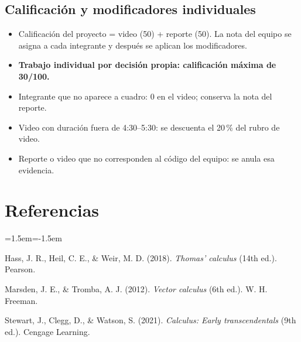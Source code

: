 \documentclass[11pt,letterpaper]{article}
\newcommand{\dest}[1]{\textcolor{accentcolor}{\textbf{#1}}}
\begin{document}
\subsection*{Calificación y modificadores individuales}
\begin{itemize}
\item Calificación del proyecto = video (50) + reporte (50). La nota del equipo se asigna a cada integrante y después se aplican los modificadores.
\item \dest{Trabajo individual por decisión propia: calificación máxima de 30/100.}
\item Integrante que no aparece a cuadro: 0 en el video; conserva la nota del reporte.
\item Video con duración fuera de 4:30--5:30: se descuenta el 20\,\% del rubro de video.
\item Reporte o video que no corresponden al código del equipo: se anula esa evidencia.
\end{itemize}

\section*{Referencias}
\begin{list}{}{\leftmargin=1.5em\itemindent=-1.5em\itemsep=3pt}
\item Hass, J. R., Heil, C. E., \& Weir, M. D. (2018). \textit{Thomas' calculus} (14th ed.). Pearson.
\item Marsden, J. E., \& Tromba, A. J. (2012). \textit{Vector calculus} (6th ed.). W. H. Freeman.
\item Stewart, J., Clegg, D., \& Watson, S. (2021). \textit{Calculus: Early transcendentals} (9th ed.). Cengage Learning.
\end{list}
\end{document}
